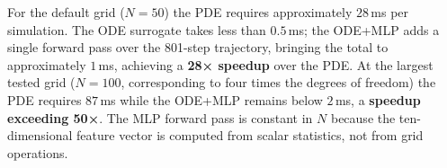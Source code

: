 \documentclass[runningheads]{llncs}
\begin{document}
For the default grid ($N = 50$) the PDE requires approximately $28$\,ms per
simulation.  The ODE surrogate takes less than $0.5$\,ms; the ODE+MLP adds a single
forward pass over the 801-step trajectory, bringing the total to approximately
$1$\,ms, achieving a \textbf{28× speedup} over the PDE.  At the largest tested grid
($N = 100$, corresponding to four times the degrees of freedom) the PDE requires
$87$\,ms while the ODE+MLP remains below $2$\,ms, a \textbf{speedup exceeding 50×}.  The MLP forward pass is constant in $N$ because the ten-dimensional feature
vector is computed from scalar statistics, not from grid operations.

\printbibliography[heading=bibintoc,title={References}]
\end{document}
